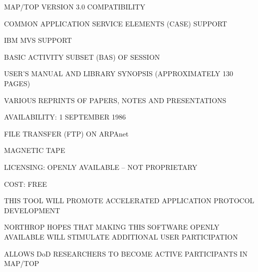 \begin{bwslide}

\begin{nrtc}
\item	MAP/TOP VERSION 3.0 COMPATIBILITY
\item	COMMON APPLICATION SERVICE ELEMENTS (CASE) SUPPORT
\item	IBM MVS SUPPORT
\item	BASIC ACTIVITY SUBSET (BAS) OF SESSION
\end {nrtc}
\end {bwslide}


\begin{bwslide}

\begin{nrtc}
\item	USER'S MANUAL AND LIBRARY SYNOPSIS
	(APPROXIMATELY 130 PAGES)
\item	VARIOUS REPRINTS OF PAPERS, NOTES AND PRESENTATIONS
\end {nrtc}
\end {bwslide}


\begin{bwslide}

\begin{nrtc}
\item	AVAILABILITY: 1 SEPTEMBER 1986
    \begin {nrtc}
    \item	FILE TRANSFER (FTP) ON ARPAnet
    \item	MAGNETIC TAPE
    \end {nrtc}
\item	LICENSING: OPENLY AVAILABLE -- NOT PROPRIETARY
\item	COST: FREE
\end {nrtc}
\end{bwslide}


\begin{bwslide}

\begin{nrtc}
\item	THIS TOOL WILL PROMOTE ACCELERATED
	APPLICATION PROTOCOL DEVELOPMENT
\item	NORTHROP HOPES THAT MAKING THIS SOFTWARE
	OPENLY AVAILABLE WILL STIMULATE
	ADDITIONAL USER PARTICIPATION
\item	ALLOWS DoD RESEARCHERS TO BECOME ACTIVE PARTICIPANTS
	IN MAP/TOP
\end{nrtc}
\end{bwslide}


